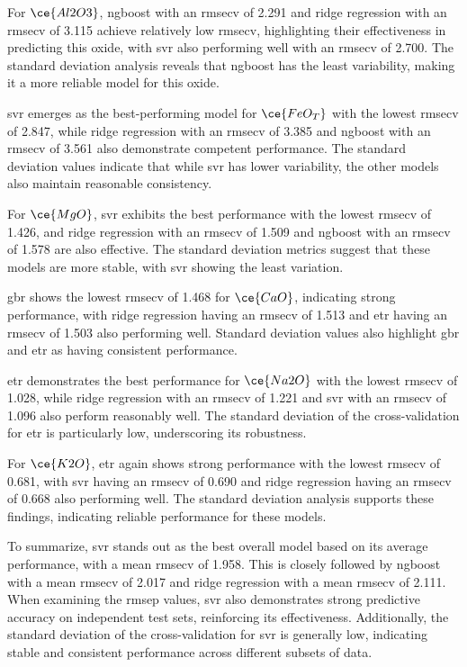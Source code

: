For $\ce{Al2O3}$, \gls{ngboost} with an \gls{rmsecv} of 2.291 and ridge regression with an \gls{rmsecv} of 3.115 achieve relatively low \gls{rmsecv}, highlighting their effectiveness in predicting this oxide, with \gls{svr} also performing well with an \gls{rmsecv} of 2.700.
The standard deviation analysis reveals that \gls{ngboost} has the least variability, making it a more reliable model for this oxide.

\gls{svr} emerges as the best-performing model for $\ce{FeO_T}$ with the lowest \gls{rmsecv} of 2.847, while ridge regression with an \gls{rmsecv} of 3.385 and \gls{ngboost} with an \gls{rmsecv} of 3.561 also demonstrate competent performance.
The standard deviation values indicate that while \gls{svr} has lower variability, the other models also maintain reasonable consistency.

For $\ce{MgO}$, \gls{svr} exhibits the best performance with the lowest \gls{rmsecv} of 1.426, and ridge regression with an \gls{rmsecv} of 1.509 and \gls{ngboost} with an \gls{rmsecv} of 1.578 are also effective.
The standard deviation metrics suggest that these models are more stable, with \gls{svr} showing the least variation.

\gls{gbr} shows the lowest \gls{rmsecv} of 1.468 for $\ce{CaO}$, indicating strong performance, with ridge regression having an \gls{rmsecv} of 1.513 and \gls{etr} having an \gls{rmsecv} of 1.503 also performing well.
Standard deviation values also highlight \gls{gbr} and \gls{etr} as having consistent performance.

\gls{etr} demonstrates the best performance for $\ce{Na2O}$ with the lowest \gls{rmsecv} of 1.028, while ridge regression with an \gls{rmsecv} of 1.221 and \gls{svr} with an \gls{rmsecv} of 1.096 also perform reasonably well.
The standard deviation of the cross-validation for \gls{etr} is particularly low, underscoring its robustness.

For $\ce{K2O}$, \gls{etr} again shows strong performance with the lowest \gls{rmsecv} of 0.681, with \gls{svr} having an \gls{rmsecv} of 0.690 and ridge regression having an \gls{rmsecv} of 0.668 also performing well.
The standard deviation analysis supports these findings, indicating reliable performance for these models.

To summarize, \gls{svr} stands out as the best overall model based on its average performance, with a mean \gls{rmsecv} of 1.958. This is closely followed by \gls{ngboost} with a mean \gls{rmsecv} of 2.017 and ridge regression with a mean \gls{rmsecv} of 2.111.
When examining the \gls{rmsep} values, \gls{svr} also demonstrates strong predictive accuracy on independent test sets, reinforcing its effectiveness.
Additionally, the standard deviation of the cross-validation for \gls{svr} is generally low, indicating stable and consistent performance across different subsets of data.

